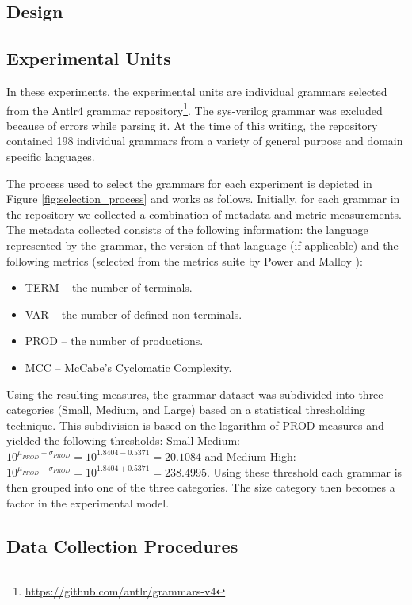 \documentclass[10pt,nocc]{xrese_report}
\begin{document}
\subsection{Design}

\subsection{Experimental Units}

In these experiments, the experimental units are individual grammars selected from the Antlr4 \cite{parr_definitive_2012} grammar repository\footnote{\url{https://github.com/antlr/grammars-v4}}. The sys-verilog grammar was excluded because of errors while parsing it. At the time of this writing, the repository contained 198 individual grammars from a variety of general purpose and domain specific languages.

The process used to select the grammars for each experiment is depicted in Figure \ref{fig:selection_process} and works as follows. Initially, for each grammar in the repository we collected a combination of metadata and metric measurements. The metadata collected consists of the following information: the language represented by the grammar, the version of that language (if applicable) and the following metrics (selected from the metrics suite by Power and Malloy \cite{power_metrics_2004}):

\begin{itemize}
\item TERM -- the number of terminals.
\item VAR -- the number of defined non-terminals.
\item PROD -- the number of productions.
\item MCC -- McCabe's Cyclomatic Complexity.
\end{itemize}

Using the resulting measures, the grammar dataset was subdivided into three categories (Small, Medium, and Large) based on a statistical thresholding technique. This subdivision is based on the logarithm of PROD measures and yielded the following thresholds: Small-Medium: $10^{\mu_{PROD}-\sigma_{PROD}} = 10^{1.8404-0.5371} = 20.1084$ and Medium-High: $10^{\mu_{PROD}-\sigma_{PROD}} = 10^{1.8404+0.5371} = 238.4995$. Using these threshold each grammar is then grouped into one of the three categories. The size category then becomes a factor in the experimental model. 



\subsection{Data Collection Procedures}
\end{document}
